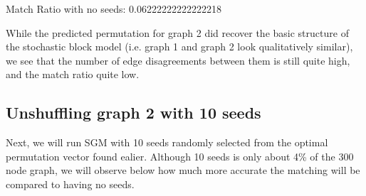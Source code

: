\documentclass[letterpaper,10pt,english]{jupyterBook}
\begin{document}
\begin{sphinxVerbatim}[commandchars=\\\{\}]
Match Ratio with no seeds:  0.06222222222222218
\end{sphinxVerbatim}

\noindent{}

\sphinxAtStartPar
While the predicted permutation for graph 2 did recover the basic structure of the stochastic block model (i.e. graph 1 and graph 2 look qualitatively similar), we see that the number of edge disagreements between them is still quite high, and the match ratio quite low.


\subsection{Unshuffling graph 2 with 10 seeds}
\label{\detokenize{applications/ch9/graph-matching-vertex:unshuffling-graph-2-with-10-seeds}}
\sphinxAtStartPar
Next, we will run SGM with 10 seeds randomly selected from the optimal permutation vector found ealier. Although 10 seeds is only about 4\% of the 300 node graph, we will observe below how much more accurate the matching will be compared to having no seeds.
\end{document}
